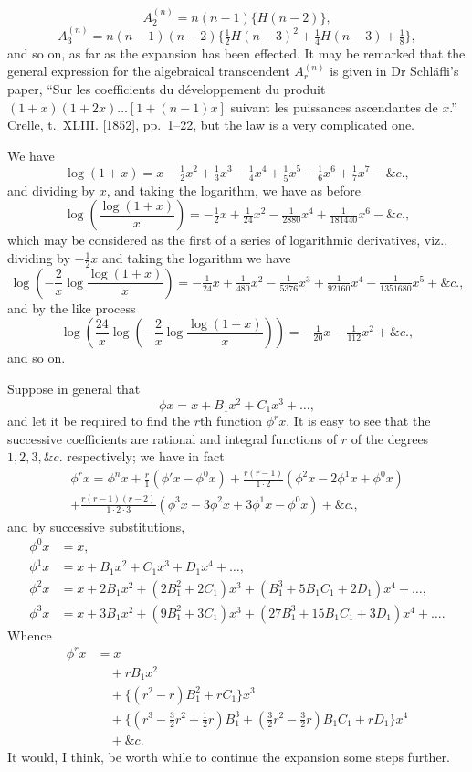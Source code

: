 \documentclass[11pt,a4paper]{book}
\begin{document}
\[
A_2^{(n)} = n(n-1)\{H(n-2)\},
\]
\[
A_3^{(n)} = n(n-1)(n-2)\{\tfrac{1}{2}H(n-3)^2 + \tfrac{1}{4}H(n-3) + \tfrac{1}{8}\},
\]
and so on, as far as the expansion has been effected. It may be remarked that the general expression for the algebraical transcendent $A_r^{(n)}$ is given in Dr Schl\"{a}fli's paper, ``Sur les coefficients du d\'{e}veloppement du produit $(1+x)(1+2x)\ldots[1+(n-1)x]$ suivant les puissances ascendantes de $x$.'' Crelle, t.~XLIII. [1852], pp.~1--22, but the law is a very complicated one.

We have
\[
\log(1+x) = x - \tfrac{1}{2}x^2 + \tfrac{1}{3}x^3 - \tfrac{1}{4}x^4 + \tfrac{1}{5}x^5 - \tfrac{1}{6}x^6 + \tfrac{1}{7}x^7 - \&c.,
\]
and dividing by $x$, and taking the logarithm, we have as before
\[
\log\left(\frac{\log(1+x)}{x}\right) = -\tfrac{1}{2}x + \tfrac{1}{24}x^2 - \tfrac{1}{2880}x^4 + \tfrac{1}{181440}x^6 - \&c.,
\]
which may be considered as the first of a series of logarithmic derivatives, viz., dividing by $-\tfrac{1}{2}x$ and taking the logarithm we have
\[
\log\left(-\frac{2}{x}\log\frac{\log(1+x)}{x}\right) = -\tfrac{1}{24}x + \tfrac{1}{480}x^2 - \tfrac{1}{5376}x^3 + \tfrac{1}{92160}x^4 - \tfrac{1}{1351680}x^5 + \&c.,
\]
and by the like process
\[
\log\left(\frac{24}{x}\log\left(-\frac{2}{x}\log\frac{\log(1+x)}{x}\right)\right) = -\tfrac{1}{20}x - \tfrac{1}{112}x^2 + \&c.,
\]
and so on.

Suppose in general that
\[
\phi x = x + B_1x^2 + C_1x^3 + \ldots,
\]
and let it be required to find the $r$th function $\phi^r x$. It is easy to see that the successive coefficients are rational and integral functions of $r$ of the degrees $1, 2, 3, \&c$. respectively; we have in fact
\begin{multline*}
\phi^r x = \phi^n x + \frac{r}{1}(\phi' x - \phi^0 x) + \frac{r(r-1)}{1\cdot 2}(\phi^2 x - 2\phi^1 x + \phi^0 x)\\
+ \frac{r(r-1)(r-2)}{1\cdot 2\cdot 3}(\phi^3 x - 3\phi^2 x + 3\phi^1 x - \phi^0 x) + \&c.,
\end{multline*}
and by successive substitutions,
\begin{align*}
\phi^0 x &= x,\\
\phi^1 x &= x + B_1x^2 + C_1x^3 + D_1x^4 + \ldots,\\
\phi^2 x &= x + 2B_1x^2 + (2B_1^2 + 2C_1)x^3 + (B_1^3 + 5B_1C_1 + 2D_1)x^4 + \ldots,\\
\phi^3 x &= x + 3B_1x^2 + (9B_1^2 + 3C_1)x^3 + (27B_1^3 + 15B_1C_1 + 3D_1)x^4 + \ldots.
\end{align*}
Whence
\begin{align*}
\phi^r x &= x\\
&\quad + rB_1x^2\\
&\quad + \{(r^2 - r)B_1^2 + rC_1\}x^3\\
&\quad + \{(r^3 - \tfrac{3}{2}r^2 + \tfrac{1}{2}r)B_1^3 + (\tfrac{3}{2}r^2 - \tfrac{3}{2}r)B_1C_1 + rD_1\}x^4\\
&\quad + \&c.
\end{align*}
It would, I think, be worth while to continue the expansion some steps further.
\end{document}
